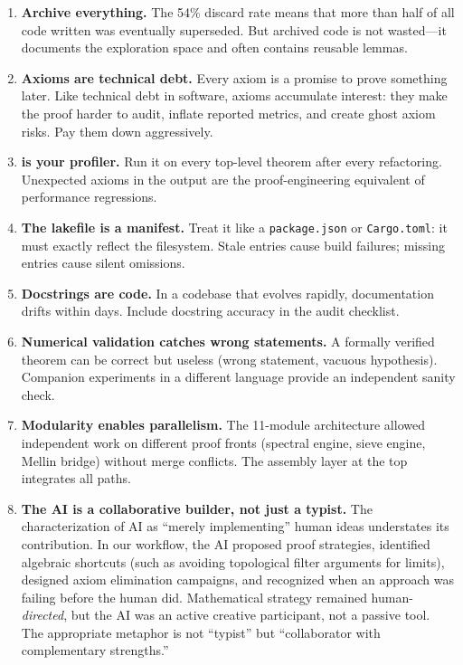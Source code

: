 \documentclass[11pt,a4paper]{article}
\begin{document}
\begin{enumerate}
  \item \textbf{Archive everything.} The 54\% discard rate means that
    more than half of all code written was eventually superseded. But
    archived code is not wasted---it documents the exploration space
    and often contains reusable lemmas.

  \item \textbf{Axioms are technical debt.} Every axiom is a promise
    to prove something later. Like technical debt in software, axioms
    accumulate interest: they make the proof harder to audit, inflate
    reported metrics, and create ghost axiom risks. Pay them down
    aggressively.

  \item \textbf{ is your profiler.} Run it on
    every top-level theorem after every refactoring. Unexpected
    axioms in the output are the proof-engineering equivalent of
    performance regressions.

  \item \textbf{The lakefile is a manifest.} Treat it like a
    \texttt{package.json} or \texttt{Cargo.toml}: it must exactly
    reflect the filesystem. Stale entries cause build failures;
    missing entries cause silent omissions.

  \item \textbf{Docstrings are code.} In a codebase that evolves
    rapidly, documentation drifts within days. Include docstring
    accuracy in the audit checklist.

  \item \textbf{Numerical validation catches wrong statements.}
    A formally verified theorem can be correct but useless (wrong
    statement, vacuous hypothesis). Companion experiments in a
    different language provide an independent sanity check.

  \item \textbf{Modularity enables parallelism.} The 11-module
    architecture allowed independent work on different proof fronts
    (spectral engine, sieve engine, Mellin bridge) without merge
    conflicts. The assembly layer at the top integrates all paths.

  \item \textbf{The AI is a collaborative builder, not just a typist.}
    The characterization of AI as ``merely implementing'' human ideas
    understates its contribution. In our workflow, the AI proposed
    proof strategies, identified algebraic shortcuts (such as avoiding
    topological filter arguments for limits), designed axiom elimination
    campaigns, and recognized when an approach was failing before the
    human did. Mathematical strategy remained human-\emph{directed},
    but the AI was an active creative participant, not a passive tool.
    The appropriate metaphor is not ``typist'' but ``collaborator with
    complementary strengths.''
\end{enumerate}
\end{document}
